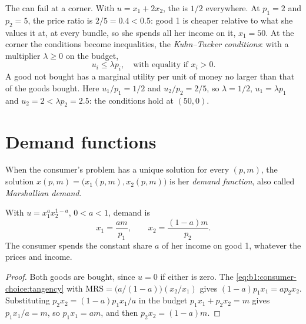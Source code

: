 The  can fail at a corner. With 
$u = x_1 + 2x_2$, the  is $1/2$ everywhere. At $p_1 = 2$ and $p_2 = 5$, the
price ratio is $2/5 = 0.4 < 0.5$: good 1 is cheaper relative to what she
values it at, at every bundle, so she spends all her income on it, $x_1 = 50$.
At the corner the conditions become inequalities, the \emph{Kuhn--Tucker
conditions}: with a multiplier $\lambda \ge 0$ on the budget,
\[
u_i \le \lambda p_i,\quad\text{with equality if } x_i > 0.
\]
A good not bought has a marginal utility per unit of money no larger than
that of the goods bought. Here $u_1/p_1 = 1/2$ and $u_2/p_2 = 2/5$, so
$\lambda = 1/2$, $u_1 = \lambda p_1$ and $u_2 = 2 < \lambda p_2 = 2.5$: the conditions
hold at $(50, 0)$.

\section{Demand functions}\label{sec:b1:consumer-choice:demand}

\begin{definition}\label{def:b1:consumer-choice:demand-function}
When the consumer's problem has a unique solution for every $(p, m)$, the
solution $x(p, m) = \bigl(x_1(p, m), x_2(p, m)\bigr)$ is her \emph{demand
function}, also called \emph{Marshallian demand}.
\end{definition}

\begin{proposition}\label{prop:b1:consumer-choice:cd-demand}
With $u = x_1^{a}x_2^{1-a}$, $0 < a < 1$, demand is
\[
x_1 = \frac{am}{p_1},\qquad x_2 = \frac{(1 - a)m}{p_2}.
\]
The consumer spends the constant share $a$ of her income on good 1,
whatever the prices and income.
\end{proposition}

\begin{proof}
Both goods are bought, since $u = 0$ if either is zero. The  \eqref{eq:b1:consumer-choice:tangency} with
$\mathrm{MRS} = \bigl(a/(1 - a)\bigr)(x_2/x_1)$ gives
$(1 - a)p_1x_1 = ap_2x_2$. Substituting $p_2x_2 = (1 - a)p_1x_1/a$ in the budget
$p_1x_1 + p_2x_2 = m$ gives $p_1x_1/a = m$, so $p_1x_1 = am$, and then
$p_2x_2 = (1 - a)m$.
\end{proof}

